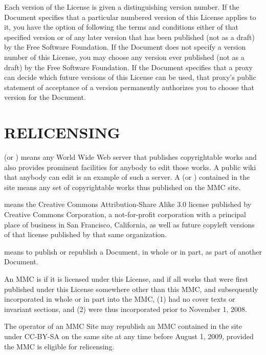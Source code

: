 Each version of the License is given a distinguishing version
number. If the Document specifies that a particular numbered
version of this License  applies to
it, you have the option of following the terms and conditions
either of that specified version or of any later version
that has been published (not as a draft) by the Free Software
Foundation. If the Document does not specify a version number
of this License, you may choose any version ever published
(not as a draft) by the Free Software Foundation. If the
Document specifies that a proxy can decide which future
versions of this License can be used, that proxy\textquoteright s public
statement of acceptance of a version permanently authorizes
you to choose that version for the Document.

\section{RELICENSING}
\label{gnu:relicensing}
 (or ) means any World Wide Web server that publishes
copyrightable works and also provides prominent facilities for
anybody to edit those works. A public wiki that anybody can
edit is an example of such a server. A  (or ) contained in the site means
any set of copyrightable works thus published on the MMC site.

 means the Creative Commons Attribution-Share
Alike 3.0 license published by Creative Commons Corporation, a
not-for-profit corporation with a principal place of business
in San Francisco, California, as well as future copyleft
versions of that license published by that same organization.

 means to publish or republish a Document,
in whole or in part, as part of another Document.

An MMC is  if it is licensed
under this License, and if all works that were first
published under this License somewhere other than this MMC,
and subsequently incorporated in whole or in part into the
MMC, (1) had no cover texts or invariant sections, and (2)
were thus incorporated prior to November 1, 2008.

The operator of an MMC Site may republish an MMC contained in
the site under CC-BY-SA on the same site at any time before
August 1, 2009, provided the MMC is eligible for relicensing.


